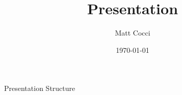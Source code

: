 \documentclass{beamer}
\title[Sort Pres]{Presentation}
\author[]{Matt Cocci}
\date{\today}
\begin{document}
\frame{\titlepage}

\begin{frame}{Presentation Structure}
  \tableofcontents
\end{frame}

\begin{frame}{}
\end{frame}
\end{document}
